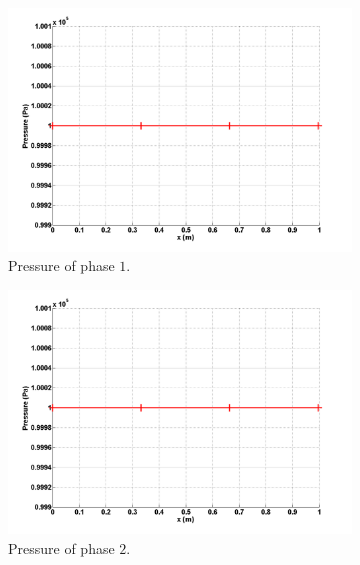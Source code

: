 %
\begin{figure}[H]
        \centering
        \begin{subfigure}[b]{0.495\textwidth}
                \centering
                \includegraphics[width=\textwidth]{figures/SEM/liquid_pressure.png}
                \caption{Pressure of phase $1$.}
                \label{fig:press-1-7-eqn-sect4}
        \end{subfigure}%
        \begin{subfigure}[b]{0.495\textwidth}
                \centering
                \includegraphics[width=\textwidth]{figures/SEM/vapor_pressure.png}
                \caption{Pressure of phase $2$.}
                \label{fig:press-2-7-eqn-sect4}
        \end{subfigure}
        \caption{\label{fig:press-7-sect4}}
\end{figure}
